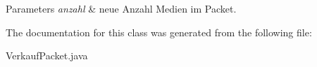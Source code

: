 \begin{DoxyParams}{Parameters}
{\em anzahl} & neue Anzahl Medien im Packet. \\
\hline
\end{DoxyParams}


The documentation for this class was generated from the following file\-:\begin{DoxyCompactItemize}
\item 
Verkauf\-Packet.\-java\end{DoxyCompactItemize}
